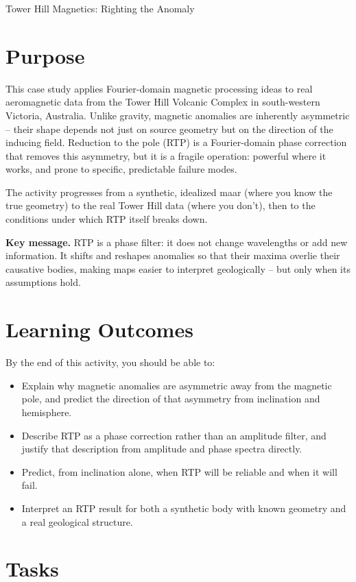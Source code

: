 \begin{activity}{Tower Hill Magnetics: Righting the Anomaly}

\section*{Purpose}

This case study applies Fourier-domain magnetic processing ideas to real aeromagnetic data from the Tower Hill Volcanic Complex in south-western Victoria, Australia. Unlike gravity, magnetic anomalies are inherently asymmetric -- their shape depends not just on source geometry but on the direction of the inducing field. Reduction to the pole (RTP) is a Fourier-domain phase correction that removes this asymmetry, but it is a fragile operation: powerful where it works, and prone to specific, predictable failure modes.

The activity progresses from a synthetic, idealized maar (where you know the true geometry) to the real Tower Hill data (where you don't), then to the conditions under which RTP itself breaks down.

\noindent\textbf{Key message.} RTP is a phase filter: it does not change wavelengths or add new information. It shifts and reshapes anomalies so that their maxima overlie their causative bodies, making maps easier to interpret geologically -- but only when its assumptions hold.

\section*{Learning Outcomes}

By the end of this activity, you should be able to:
\begin{itemize}
  \item Explain why magnetic anomalies are asymmetric away from the magnetic pole, and predict the direction of that asymmetry from inclination and hemisphere.
  \item Describe RTP as a phase correction rather than an amplitude filter, and justify that description from amplitude and phase spectra directly.
  \item Predict, from inclination alone, when RTP will be reliable and when it will fail.
  \item Interpret an RTP result for both a synthetic body with known geometry and a real geological structure.
\end{itemize}

\section*{Tasks}


\end{activity}
